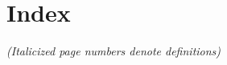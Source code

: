 
\section*{Index}
\noindent\emph{(Italicized page numbers denote definitions)}

\newcommand{\idxdef}[1]{\emph{#1}}
\newcommand{\indexentry}[1]{\par\noindent #1\par}

\begingroup
\small
\setlength{\parindent}{0pt}
\setlength{\parskip}{0pt}
\setlength{\columnsep}{2em}
\raggedcolumns

